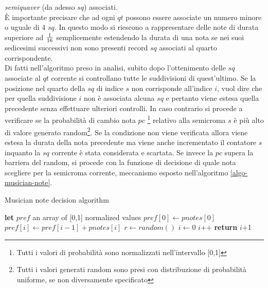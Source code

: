 \emph{semiquaver} (da adesso $sq$) associati.\\
È importante precisare che ad ogni $qt$ possono essere
associate un numero minore o uguale di 4 $sq$. In questo modo si
riescono a rappresentare delle note di durata superiore ad $1\over{16}$ 
semplicemente estendendo la durata di una nota se nei suoi sedicesimi successivi 
non sono presenti record $sq$ associati al quarto
corrispondente.\\
Di fatti nell'algoritmo preso in analisi, subito dopo l'ottenimento
delle $sq$ associate al $qt$ corrente si controllano tutte le
suddivisioni di quest'ultimo. 
Se la posizione nel quarto della $sq$ 
di indice $s$ non corrisponde all'indice $i$, vuol dire che per quella
suddivisione $i$ non è associata alcuna $sq$ e pertanto
viene estesa quella precedente senza effettuare ulteriori controlli.
In caso contrario si procede a verificare se la probabilità di cambio
nota $pc$ 
\footnote{Tutti i valori di probabilità sono normalizzati
nell'intervallo [0,1]} relativo alla semicroma $s$ è più alto di valore 
generato random\footnote{Tutti i valori generati random sono presi con
distribuzione di probabilità uniforme, se non diversamente specificato}. 
Se la condizione non viene verificata allora viene
estesa la durata della nota precedente ma viene anche incrementato il
contatore $s$ inquanto la $sq$ corrente è stata considerata e scartata.
Se invece la $pc$ supera la barriera del random, si procede con la
funzione di decisione di quale nota scegliere per la semicroma corrente,
meccanismo esposto nell'algoritmo \ref{algo-musician-note}.

\begin{algorithm}[H]
\caption{Musician note decision algorithm}
\label{algo-musician-note}
\begin{algorithmic}[1]
	\State \textbf{let} $pref$ an array of [0,1] normalized values
	\State $pref[0]\gets pnotes[0]$
	 
		\State $pref[i] \gets pref[i - 1] + pnotes[i]$
	\EndFor
	\State $r \gets random()$
	\State $i \gets 0 $
		\State $i$++	
	\EndWhile
	\State \textbf{return} $i$+1 
\EndFunction
\end{algorithmic}
\end{algorithm}

